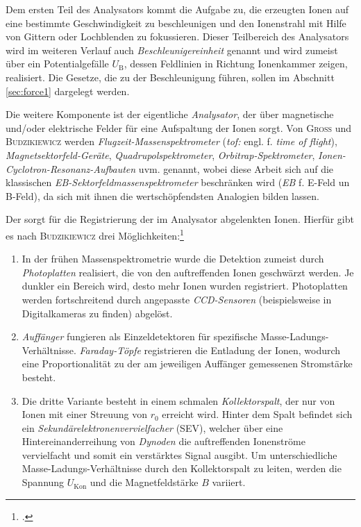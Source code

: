 \begin{items}
Dem ersten Teil des Analysators kommt die Aufgabe zu, die erzeugten Ionen auf eine bestimmte Geschwindigkeit zu beschleunigen und den Ionenstrahl mit Hilfe von Gittern oder Lochblenden zu fokussieren. Dieser Teilbereich des Analysators wird im weiteren Verlauf auch \textit{Beschleunigereinheit} genannt und wird zumeist über ein Potentialgefälle $U_\mathrm{B}$, dessen Feldlinien in Richtung Ionenkammer zeigen, realisiert. Die Gesetze, die zu der Beschleunigung führen, sollen im Abschnitt \ref{sec:force1} dargelegt werden.

Die weitere Komponente ist der eigentliche \textit{Analysator}, der über magnetische und/oder elektrische Felder für eine Aufspaltung der Ionen sorgt. Von \textsc{Gross} und \textsc{Budzikiewicz} werden \textit{Flugzeit-Massenspektrometer} (\textit{tof:} engl. f. \textit{time of flight}), \textit{Magnetsektorfeld-Geräte}, \textit{Quadrupolspektrometer}, \textit{Orbitrap-Spektrometer}, \textit{Ionen-Cyclotron-Resonanz-Aufbauten} uvm. genannt, wobei diese Arbeit sich auf die klassischen \textit{EB-Sektorfeld{\-}massen{\-}spek{\-}tro{\-}met{\-}er} beschränken wird (\textit{EB} f. E-Feld un B-Feld), da sich mit ihnen die wertschöpfendsten Analogien bilden lassen.
\item Der  sorgt für die Registrierung der im Analysator abgelenkten Ionen. Hierfür gibt es nach \textsc{Budzikiewicz} drei Möglichkeiten:\footcite[vgl.][S.\,44--45]{Budz2005}
\begin{enumerate}
\item In der frühen Massenspektrometrie wurde die Detektion zumeist durch \textit{Photoplatten} realisiert, die von den auftreffenden Ionen geschwärzt werden. Je dunkler ein Bereich wird, desto mehr Ionen wurden registriert. Photoplatten werden fortschreitend durch angepasste \textit{CCD-Sensoren} (beispielsweise in Digitalkameras zu finden) abgelöst.
\item \textit{Auffänger} fungieren als Einzeldetektoren für spezifische Masse-Ladungs-Verhältnisse. \textit{Faraday-Töpfe} registrieren die Entladung der Ionen, wodurch eine Proportionalität zu der am jeweiligen Auffänger gemessenen Stromstärke besteht.
\item Die dritte Variante besteht in einem schmalen \textit{Kollektorspalt}, der nur von Ionen mit einer Streuung von $r_0$ erreicht wird. Hinter dem Spalt befindet sich ein \textit{Sekundärelektronenvervielfacher} (SEV), welcher über eine Hintereinanderreihung von \textit{Dynoden} die auftreffenden Ionenströme vervielfacht und somit ein verstärktes Signal ausgibt. Um unterschiedliche Masse-Ladungs-Verhältnisse durch den Kollektorspalt zu leiten, werden die Spannung $U_\mathrm{Kon}$ und die Magnetfeldstärke $B$ variiert. 

\end{enumerate}
\end{items}
